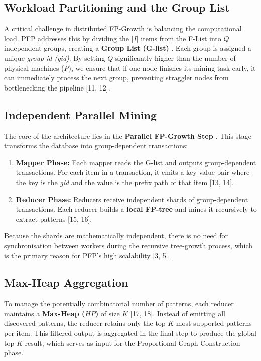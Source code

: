 \documentclass[10pt, twocolumn]{article}
\begin{document}
\subsection{Workload Partitioning and the Group List}

A critical challenge in distributed FP-Growth is balancing the computational
load. PFP addresses this by dividing the $|I|$ items from the F-List into $Q$
independent groups, creating a \textbf{Group List (G-list)} .
Each group is assigned a unique \textit{group-id (gid)}. By setting $Q$
significantly higher than the number of physical machines ($P$), we ensure
that if one node finishes its mining task early, it can immediately process
the next group, preventing straggler nodes from bottlenecking the
pipeline [11, 12].

\subsection{Independent Parallel Mining}

The core of the architecture lies in the \textbf{Parallel FP-Growth
Step} . This stage transforms the database into group-dependent
transactions:
\begin{enumerate}
    \item \textbf{Mapper Phase:} Each mapper reads the G-list and outputs
          group-dependent transactions. For each item in a transaction, it emits
          a key-value pair where the key is the \textit{gid} and the value is
          the prefix path of that item [13, 14].
    \item \textbf{Reducer Phase:} Reducers receive independent shards of
          group-dependent transactions. Each reducer builds a \textbf{local
          FP-tree} and mines it recursively to extract patterns [15, 16].
\end{enumerate}
Because the shards are mathematically independent, there is no need for
synchronisation between workers during the recursive tree-growth process,
which is the primary reason for PFP's high scalability [3, 5].

\subsection{Max-Heap Aggregation}

To manage the potentially combinatorial number of patterns, each reducer
maintains a \textbf{Max-Heap ($HP$)} of size $K$ [17, 18]. Instead of
emitting all discovered patterns, the reducer retains only the top-$K$ most
supported patterns per item. This filtered output is aggregated in the final
step to produce the global top-$K$ result, which serves as input for the
Proportional Graph Construction phase.
\end{document}
